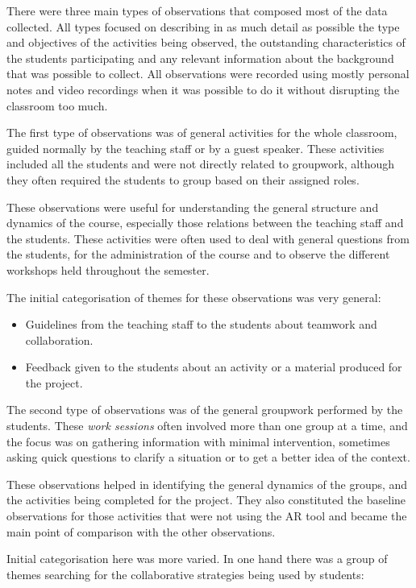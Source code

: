 There were three main types of observations that composed most of the data collected. All types focused on describing in as much detail as possible the type and objectives
of the activities being observed, the outstanding characteristics of the students participating and any relevant information about the background that was possible to
collect. All observations were recorded using mostly personal notes and video recordings when it was possible to do it without disrupting the classroom too much.

The first type of observations was of general activities for the whole classroom, guided normally by the teaching staff or by a guest speaker. These activities included
all the students and were not directly related to groupwork, although they often required the students to group based on their assigned roles.

These observations were useful for understanding the general structure and dynamics of the course, especially those relations between the teaching staff and the students.
These activities were often used to deal with general questions from the students, for the administration of the course and to observe the different workshops held
throughout the semester.

The initial categorisation of themes for these observations was very general:

\begin{itemize}
    \item Guidelines from the teaching staff to the students about teamwork and collaboration.
    \item Feedback given to the students about an activity or a material produced for the project.
\end{itemize}

The second type of observations was of the general groupwork performed by the students. These \emph{work sessions} often involved more than one group at a time, and the
focus was on gathering information with minimal intervention, sometimes asking quick questions to clarify a situation or to get a better idea of the context.

These observations helped in identifying the general dynamics of the groups, and the activities being completed for the project. They also constituted the baseline
observations for those activities that were not using the \ac{AR} tool and became the main point of comparison with the other observations.

Initial categorisation here was more varied. In one hand there was a group of themes searching for the collaborative strategies being used by students:

